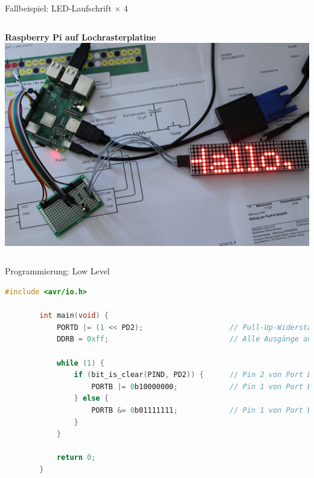 {\begin{frame}{Fallbeispiel: LED-Laufschrift $\times$ 4}
\begin{columns}
        \textbf{Raspberry Pi auf Lochrasterplatine}
        \includegraphics[width=.9\textwidth]{img/laufschrift_pi2}
    \end{columns}
\end{frame}
}

\begin{frame}[fragile]{Programmierung: Low Level}

    \bigskip

    \begin{lstlisting}[language=C, gobble=8]
        #include <avr/io.h>

        int main(void) {
            PORTD |= (1 << PD2);                    // Pull-Up-Widerstand aktivieren
            DDRB = 0xff;                            // Alle Ausgänge an Port B ausschalten

            while (1) {
                if (bit_is_clear(PIND, PD2)) {      // Pin 2 von Port D auf Ground gezogen?
                    PORTB |= 0b10000000;            // Pin 1 von Port B einschalten
                } else {
                    PORTB &= 0b01111111;            // Pin 1 von Port B ausschalten
                }
            }

            return 0;
        }
    \end{lstlisting}

    \bigskip

\end{frame}


